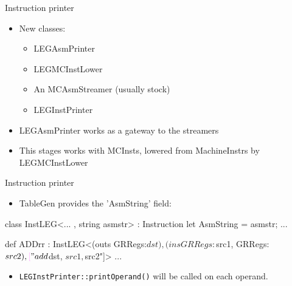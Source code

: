 

\begin{frame}{Instruction printer}

\begin{itemize}
    \item New classes:
    \begin{itemize}
        \item LEGAsmPrinter
        \item LEGMCInstLower
        \item An MCAsmStreamer (usually stock)
        \item LEGInstPrinter
    \end{itemize}
    \item LEGAsmPrinter works as a gateway to the streamers
    \item This stages works with MCInsts, lowered from MachineInstrs by LEGMCInstLower
\end{itemize}

\end{frame}


\begin{frame}[fragile]{Instruction printer}

\begin{itemize}
    \item TableGen provides the 'AsmString' field:
\end{itemize}

\begin{codebox}
class InstLEG<... , string asmstr> : Instruction {
  let AsmString = asmstr;
  ...
}
\end{codebox}

\begin{codebox}[commandchars=\\\[\]]
def ADDrr : InstLEG<(outs GRRegs:$dst),
                    (ins GRRegs:$src1, GRRegs:$src2),
                    \codeempha["add $dst, $src1, $src2"]> {
  ...
}
\end{codebox}

\begin{itemize}
  \item \texttt{LEGInstPrinter::printOperand()} will be called on each operand.
\end{itemize}

\end{frame}

